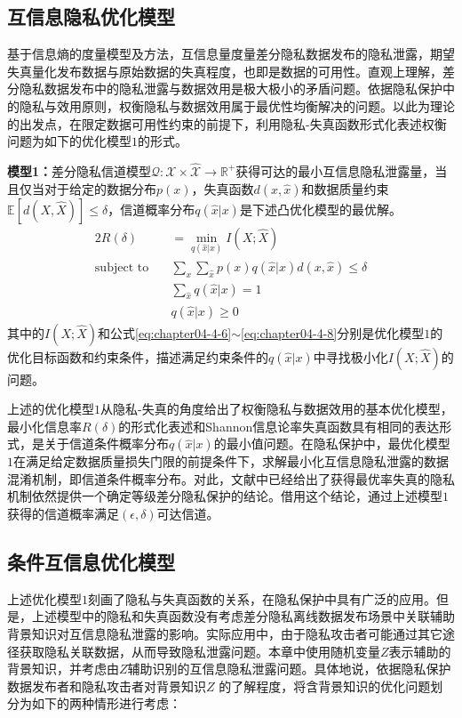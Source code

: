 \subsection{互信息隐私优化模型}\label{subsec:chapter05-mi-optimazation}
基于信息熵的度量模型及方法，互信息量度量差分隐私数据发布的隐私泄露，期望失真量化发布数据与原始数据的失真程度，也即是数据的可用性。直观上理解，差分隐私数据发布中的隐私泄露与数据效用是极大极小的矛盾问题。依据隐私保护中的隐私与效用原则\cite{sankar2013utility}，权衡隐私与数据效用属于最优性均衡解决的问题。以此为理论的出发点，在限定数据可用性约束的前提下，利用隐私-失真函数形式化表述权衡问题为如下的优化模型$1$的形式。

\textbf{模型1：}差分隐私信道模型$\mathcal{Q}:\mathcal{X}\times \mathcal{\hat{X}}\rightarrow \mathbb{R}^{+}$获得可达的最小互信息隐私泄露量，当且仅当对于给定的数据分布$p(x)$，失真函数$d(x,\hat{x})$和数据质量约束$\mathbb{E}[d(X,\hat{X})]\leq \delta$，信道概率分布$q(\hat{x}|x)$是下述凸优化模型的最优解。
\begin{alignat}{2}
	R(\delta) & =\min_{q(\hat{x}|x)}I(X;\hat{X}) \nonumber \\
	\mbox{subject to} \quad
	& \sum_{x}\sum_{\hat{x}}p(x)q(\hat{x}|x)d(x,\hat{x})\leq  \delta \label{eq:chapter04-4-6}\\
	& \sum_{\hat{x}}q(\hat{x}|x)=1 \\
	& q(\hat{x}|x) \geq 0\label{eq:chapter04-4-8}
\end{alignat}
其中的$I(X;\hat{X})$和公式\ref{eq:chapter04-4-6}$\sim$\ref{eq:chapter04-4-8}分别是优化模型$1$的优化目标函数和约束条件，描述满足约束条件的$q(\hat{x}|x)$中寻找极小化$I(X;\hat{X})$的问题。

上述的优化模型$1$从隐私-失真的角度\cite{wang2016on}给出了权衡隐私与数据效用的基本优化模型，最小化信息率$R(\delta)$的形式化表述和Shannon信息论率失真函数\cite{cover2006elements}具有相同的表达形式，是关于信道条件概率分布$q(\hat{x}|x)$的最小值问题。在隐私保护中，最优化模型$1$在满足给定数据质量损失门限的前提条件下，求解最小化互信息隐私泄露的数据混淆机制，即信道条件概率分布。对此，文献中已经给出了获得最优率失真的隐私机制依然提供一个确定等级差分隐私保护的结论。借用这个结论，通过上述模型$1$获得的信道概率满足$(\epsilon,\delta)$可达信道。
\subsection{条件互信息优化模型}\label{subsec:chapter-05-conditional-mioptimization}

上述优化模型$1$刻画了隐私与失真函数的关系，在隐私保护中具有广泛的应用\cite{wang2016on,sarwate2014a,mir2012information}。但是，上述模型中的隐私和失真函数没有考虑差分隐私离线数据发布场景中关联辅助背景知识对互信息隐私泄露的影响。实际应用中，由于隐私攻击者可能通过其它途径获取隐私关联数据，从而导致隐私泄露问题。本章中使用随机变量$Z$表示辅助的背景知识，并考虑由$Z$辅助识别的互信息隐私泄露问题。具体地说，依据隐私保护数据发布者和隐私攻击者对背景知识$Z$
的了解程度，将含背景知识的优化问题划分为如下的两种情形进行考虑：

